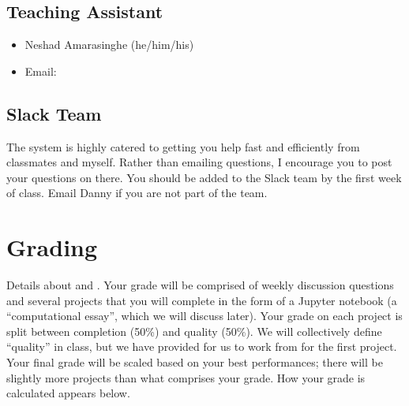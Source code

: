 \documentclass[letterpaper,10pt,english]{jupyterBook}
\begin{document}
\subsection{Teaching Assistant}
\label{\detokenize{content/0_course/syllabus:teaching-assistant}}\begin{itemize}
\item {} 
\sphinxAtStartPar
Neshad Amarasinghe (he/him/his)

\item {} 
\sphinxAtStartPar
Email: 

\end{itemize}


\subsection{Slack Team}
\label{\detokenize{content/0_course/syllabus:slack-team}}
\sphinxAtStartPar
{} The system is highly catered to getting you help fast and efficiently from classmates and myself. Rather than emailing questions, I encourage you to post your questions on there. You should be added to the Slack team by the first week of class. Email Danny if you are not part of the team.

\sphinxAtStartPar
{} 


\section{Grading}
\label{\detokenize{content/0_course/syllabus:grading}}
\sphinxAtStartPar
Details about {\hyperref[\detokenize{content/0_course/design::doc}]{}} and {\hyperref[\detokenize{content/0_course/assessments::doc}]{}}. Your grade will be comprised of weekly discussion questions and several projects that you will complete in the form of a Jupyter notebook (a “computational essay”, which we will discuss later). Your grade on each project is split between completion (50\%) and quality (50\%). We will collectively define “quality” in class, but we have provided {\hyperref[\detokenize{content/0_course/rubric::doc}]{}} for us to work from for the first project. Your final grade will be scaled based on your best performances; there will be slightly more projects than what comprises your grade.   How your grade is calculated appears below.
\end{document}
